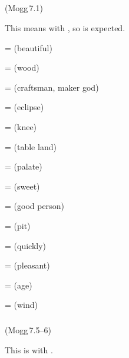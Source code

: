 \subparagraph*{} (Mogg\,7.1)\label{pacckx:dnu1}

This means  with , so  is expected.

 =  (beautiful)\par
{} =  (wood)\par
{} =  (craftsman, maker god)\par
{} =  (eclipse)\par
{} =  (knee)\par
{} =  (table land)\par
{} =  (palate)\par
{} =  (sweet)\par
{} =  (good person)\par
{} =  (pit)\par
{} =  (quickly)\par
{} =  (pleasant)\par
{} =  (age)\par
{} =  (wind)\par

\subparagraph*{} (Mogg\,7.5--6)\label{pacckx:ku}

This is  with .

